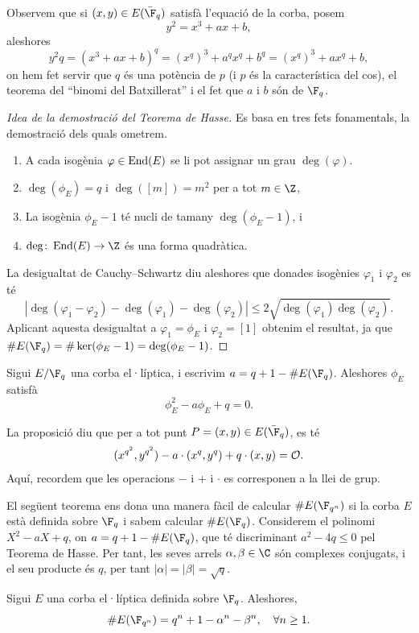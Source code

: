 \begin{remark}
Observem que si $(x,y)\in E(\bar\F_q)$ satisfà l'equació de la corba, posem
\[
y^2=x^3+ax+b,
\]
aleshores
\[
y^2q = (x^3+ax+b)^q = (x^q)^3 + a^q x^q + b^q = (x^q)^3 + ax^q + b,
\]
on hem fet servir que $q$ és una potència de $p$ (i $p$ és la característica del cos), el teorema del ``binomi del Batxillerat'' i el fet que $a$ i $b$ són de $\F_q$.
\end{remark}

\begin{proof}[Idea de la demostració del Teorema de Hasse]
Es basa en tres fets fonamentals, la demostració dels quals ometrem.
\begin{enumerate}
    \item A cada isogènia $\varphi\in \operatorname{End}(E)$ se li pot assignar un grau $\deg(\varphi)$.
    \item $\deg(\phi_E)=q$ i $\deg([m])=m^2$ per a tot $m\in\Z$,
    \item La isogènia $\phi_E-1$ té nucli de tamany $\deg(\phi_E-1)$, i
    \item $\deg\colon\End(E)\to\Z$ és una forma quadràtica.
\end{enumerate}
La desigualtat de Cauchy--Schwartz diu aleshores que donades isogènies $\varphi_1$ i $\varphi_2$ es té
\[
|\deg(\varphi_1-\varphi_2)-\deg(\varphi_1)-\deg(\varphi_2)|\leq 2\sqrt{\deg(\varphi_1)\deg(\varphi_2)}.
\]
Aplicant aquesta desigualtat a $\varphi_1=\phi_E$ i $\varphi_2=[1]$ obtenim el resultat, ja que $\#E(\F_q)=\#\ker(\phi_E-1)=\deg(\phi_E-1)$.
\end{proof}
\begin{proposition}
 Sigui $E/\F_q$ una corba el·líptica, i escrivim $a= q+1 - \#E(\F_q)$. Aleshores $\phi_E$ satisfà
\[
\phi_E^2 - a\phi_E + q =0.
\]
\end{proposition}

\begin{remark}
La proposició diu que per a tot punt $P=(x,y) \in E(\bar\F_q)$, es té
\[
(x^{q^2},y^{q^2}) - a\cdot (x^q,y^q) + q\cdot(x,y) = \mathcal{O}.
\]
Aquí, recordem que les operacions $-$ i $+$ i $\cdot$ es corresponen a la llei de grup.
\end{remark}

El següent teorema ens dona una manera fàcil de calcular $\#E(\F_{q^n})$ si la corba $E$ està definida sobre $\F_q$ i sabem calcular $\#E(\F_q)$. Considerem el polinomi $X^2-aX + q$, on $a=q+1-\# E(\F_q)$, que té discriminant $a^2-4q \leq 0$ pel Teorema de Hasse. Per tant, les seves arrels $\alpha,\beta\in\C$ són complexes conjugats, i el seu producte és $q$, per tant $|\alpha|=|\beta|=\sqrt{q}$.
\begin{theorem}
 Sigui $E$ una corba el·líptica definida sobre $\F_q$. Aleshores,
 \[
 \# E(\F_{q^n}) = q^n + 1 - \alpha^n - \beta^n,\quad \forall n\geq 1.
 \]
\end{theorem}
 
